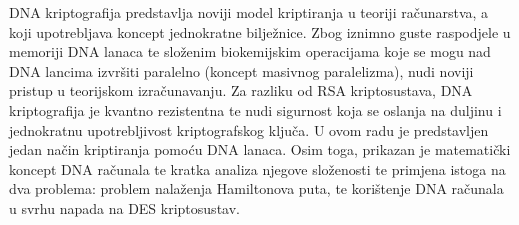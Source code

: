 \documentclass[a4paper,oneside,12pt]{memoir} %
\begin{document}
\begin{spacing}{1.5}
\newpage
\nocite{*}


\pagestyle{empty}
\begin{sazetak}
DNA kriptografija predstavlja noviji model kriptiranja u teoriji računarstva, a koji upotrebljava koncept jednokratne bilježnice. Zbog iznimno guste raspodjele u memoriji DNA lanaca te složenim biokemijskim operacijama koje se mogu nad DNA lancima izvršiti paralelno (koncept masivnog paralelizma), nudi noviji pristup u teorijskom izračunavanju. Za razliku od RSA kriptosustava, DNA kriptografija je kvantno rezistentna te nudi sigurnost koja se oslanja na duljinu i jednokratnu upotrebljivost kriptografskog ključa. U ovom radu je predstavljen jedan način kriptiranja pomoću DNA lanaca. Osim toga, prikazan je matematički koncept DNA računala te kratka analiza njegove složenosti te primjena istoga na dva problema: problem nalaženja Hamiltonova puta, te korištenje DNA računala u svrhu napada na DES kriptosustav.
\end{sazetak}


\end{spacing}
\end{document}
